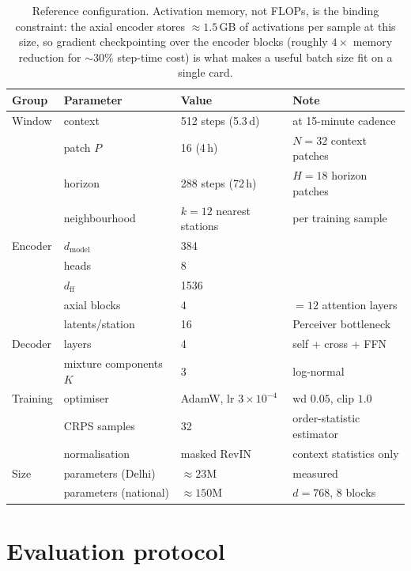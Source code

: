 \documentclass[11pt,a4paper]{article}
\begin{document}
\begin{table}[h]
\centering
\small
\begin{tabular}{@{}llll@{}}
\toprule
Group & Parameter & Value & Note \\
\midrule
Window & context & 512 steps (5.3\,d) & at 15-minute cadence \\
       & patch $P$ & 16 (4\,h) & $N=32$ context patches \\
       & horizon & 288 steps (72\,h) & $H=18$ horizon patches \\
       & neighbourhood & $k=12$ nearest stations & per training sample \\
\midrule
Encoder & $d_{\text{model}}$ & 384 & \\
        & heads & 8 & \\
        & $d_{\text{ff}}$ & 1536 & \\
        & axial blocks & 4 & $=12$ attention layers \\
        & latents/station & 16 & Perceiver bottleneck \\
\midrule
Decoder & layers & 4 & self + cross + FFN \\
        & mixture components $K$ & 3 & log-normal \\
\midrule
Training & optimiser & AdamW, lr $3\times10^{-4}$ & wd $0.05$, clip $1.0$ \\
         & CRPS samples & 32 & order-statistic estimator \\
         & normalisation & masked RevIN & context statistics only \\
\midrule
Size & parameters (Delhi) & $\approx23$M & measured \\
     & parameters (national) & $\approx150$M & $d=768$, 8 blocks \\
\bottomrule
\end{tabular}
\caption{Reference configuration. Activation memory, not FLOPs, is the binding
constraint: the axial encoder stores $\approx1.5$\,GB of activations per sample
at this size, so gradient checkpointing over the encoder blocks (roughly $4\times$
memory reduction for $\sim\!30\%$ step-time cost) is what makes a useful batch
size fit on a single card.}
\end{table}

\section{Evaluation protocol}
\end{document}
